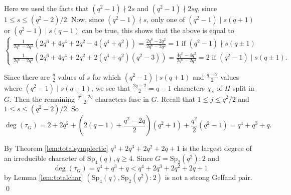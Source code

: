 \documentclass[10pt,a4paper]{amsart}
\theoremstyle{plain}
\theoremstyle{definition}
\numberwithin{equation}{section}
\begin{document}
Here we used the facts that $(q^2-1)\nmid 2s$ and $(q^2-1) \nmid 2sq$, since $1\le s\le (q^2-2)/2$. Now, since $(q^2-1) \nmid s$, only one of $(q^2-1) \mid s(q+1)$ or $(q^2-1) \mid s(q-1)$ can be true, this shows that the above is equal to 
$$ \begin{cases}
\frac{1}{2q^6-2q^2}\left(2q^6+4q^4+2q^2 -4(q^4+q^2)\right) = \frac{2q^6-2q^2}{2q^6-2q^2} =1 \text{ if } (q^2-1) \nmid s(q\pm 1)\\
\frac{1}{2q^6-2q^2}\left(2q^6+4q^4+2q^2 +  2(q^4+q^2)(q^2-3)\right) = \frac{4q^6-4q^2}{2q^6-2q^2} = 2 \text{ if } (q^2-1) \mid s(q\pm 1).
\end{cases}
$$

Since there are $\frac{q}{2}$ values of $s$ for which $(q^2-1) \mid s(q+1)$ and $\frac{q-2}{2}$ values where $(q^2-1) \mid s(q-1)$,  we see  that $\frac{2q-2}{2}=q-1$ characters $\chi_s$ of $H$ split in $G$. Then the remaining $\frac{q^2-2q}{2}$ characters fuse in $G$. Recall that $1\leq j \leq q^2/2$ and $1 \leq s \leq (q^2-2)/2$. 
So 
$$
\deg\left(\tau_{G}\right) = 2 + 2q^2 + \left(2(q-1) + \frac{q^2-2q}{2}\right)(q^2+1) + \frac{q^2}{2}\left(q^2-1\right) = q^4+q^3+q.
$$

By Theorem  \ref {lem:totalsymplectic}  $q^4+2q^3+2q^2+2q+1$ is the largest degree of an irreducible character of $\mathrm{Sp}_4(q), q\geq 4$.   Since $G = \mathrm{Sp}_2\left(q^2\right)\colon 2$ and
$$
\deg\left(\tau_{G}\right) =  q^4+q^3+q < q^4+2q^3+2q^2+2q+1
$$
by Lemma \ref {lem:totalchar}  $\left(\mathrm{Sp}_4(q), \mathrm{Sp}_2\left(q^2\right)\colon 2\right)$ is not a strong Gelfand pair.
\qed
\end{document}
